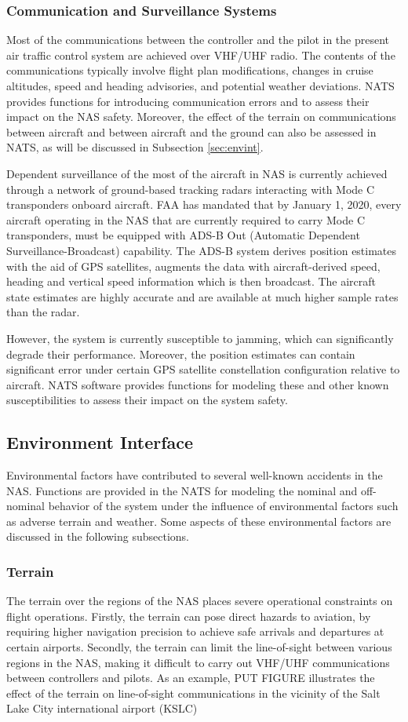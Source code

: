 \documentclass[11pt]{book}              %
\begin{document}
\subsubsection{Communication and Surveillance Systems}
Most of the communications between the controller and the pilot in the present air traffic control system are achieved over VHF/UHF radio. The contents of the communications typically involve flight plan modifications, changes in cruise altitudes, speed and heading advisories, and potential weather deviations. NATS provides functions for introducing communication errors and to assess their impact on the NAS safety. Moreover, the effect of the terrain on communications between aircraft and between aircraft and the ground can also be assessed in NATS, as will be discussed in Subsection \ref{sec:envint}.\par
Dependent surveillance of the most of the aircraft in NAS is currently achieved through a network of ground-based tracking radars interacting with Mode C transponders onboard aircraft. FAA has mandated that by January 1, 2020, every aircraft operating in the NAS that are currently required to carry Mode C transponders, must be equipped with ADS-B Out (Automatic Dependent Surveillance-Broadcast) capability. The ADS-B system derives position estimates with the aid of GPS satellites, augments the data with aircraft-derived speed, heading and vertical speed information which is then broadcast. The aircraft state estimates are highly accurate and are available at much higher sample rates than the radar. \par
However, the system is currently susceptible to jamming, which can significantly degrade their performance. Moreover, the position estimates can contain significant error under certain GPS satellite constellation configuration relative to aircraft. NATS software provides functions for modeling these and other known susceptibilities to assess their impact on the system safety.
\subsection{Environment Interface\label{sec:envint}} 
Environmental factors have contributed to several well-known accidents in the NAS. Functions are provided in the NATS for modeling the nominal and off-nominal behavior of the system under the influence of environmental factors such as adverse terrain and weather. Some aspects of these environmental factors are discussed in the following subsections.
\subsubsection{Terrain}
The terrain over the regions of the NAS places severe operational constraints on flight operations. Firstly, the terrain can pose direct hazards to aviation, by requiring higher navigation precision to achieve safe arrivals and departures at certain airports. Secondly, the terrain can limit the line-of-sight between various regions in the NAS, making it difficult to carry out VHF/UHF communications between controllers and pilots. As an example, PUT FIGURE illustrates the effect of the terrain on line-of-sight communications in the vicinity of the Salt Lake City international airport (KSLC)
\end{document}
